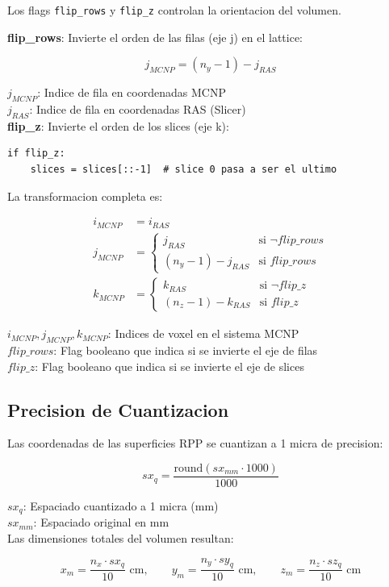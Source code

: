 \documentclass[12pt,a4paper]{article}
\newcommand{\vardef}[2]{\noindent\textbf{#1}: #2\\}
\begin{document}
Los flags \texttt{flip\_rows} y \texttt{flip\_z} controlan la orientacion del volumen.

\textbf{flip\_rows}: Invierte el orden de las filas (eje j) en el lattice:

$$
j_{MCNP} = (n_y - 1) - j_{RAS}
$$

\vardef{$j_{MCNP}$}{Indice de fila en coordenadas MCNP}
\vardef{$j_{RAS}$}{Indice de fila en coordenadas RAS (Slicer)}

\textbf{flip\_z}: Invierte el orden de los slices (eje k):

\begin{verbatim}
if flip_z:
    slices = slices[::-1]  # slice 0 pasa a ser el ultimo
\end{verbatim}

La transformacion completa es:

$$
\begin{aligned}
i_{MCNP} &= i_{RAS} \\
j_{MCNP} &= \begin{cases}
j_{RAS} & \text{si } \neg flip\_rows \\
(n_y - 1) - j_{RAS} & \text{si } flip\_rows
\end{cases} \\
k_{MCNP} &= \begin{cases}
k_{RAS} & \text{si } \neg flip\_z \\
(n_z - 1) - k_{RAS} & \text{si } flip\_z
\end{cases}
\end{aligned}
$$

\vardef{$i_{MCNP}, j_{MCNP}, k_{MCNP}$}{Indices de voxel en el sistema MCNP}
\vardef{$flip\_rows$}{Flag booleano que indica si se invierte el eje de filas}
\vardef{$flip\_z$}{Flag booleano que indica si se invierte el eje de slices}

\subsection{Precision de Cuantizacion}

Las coordenadas de las superficies RPP se cuantizan a 1 micra de precision:

$$
sx_q = \frac{\text{round}(sx_{mm} \cdot 1000)}{1000}
$$

\vardef{$sx_q$}{Espaciado cuantizado a 1 micra (mm)}
\vardef{$sx_{mm}$}{Espaciado original en mm}

Las dimensiones totales del volumen resultan:

$$
x_m = \frac{n_x \cdot sx_q}{10}\text{ cm},\qquad
y_m = \frac{n_y \cdot sy_q}{10}\text{ cm},\qquad
z_m = \frac{n_z \cdot sz_q}{10}\text{ cm}
$$
\end{document}
